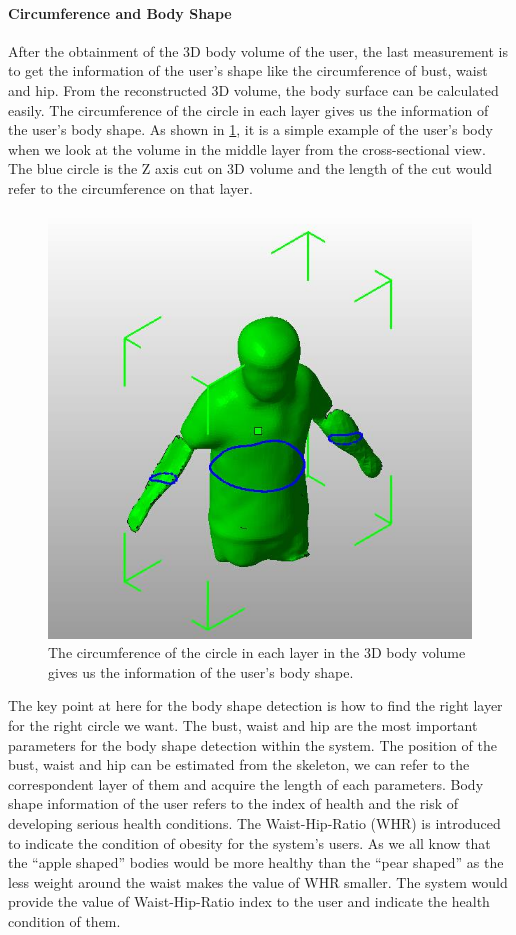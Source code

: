 \paragraph{Circumference and Body Shape}
After the obtainment of the 3D body volume of the user, the last measurement is to get the information of the user's shape like the circumference of bust, waist and hip. %
From the reconstructed 3D volume, the body surface can be calculated easily. The circumference of the circle in each layer gives us the information of the user's body shape. As shown in \figurename{\ref{fig:3-PRMM:Circumference}}, it is a simple example of the user's body when we look at the volume in the middle layer from the cross-sectional view. The blue circle is the Z axis cut on 3D volume and the length of the cut would refer to the circumference on that layer.
\begin{figure}
	\centering
	\includegraphics[width=0.5\linewidth]{figures/3-PRMM/Circumference}
	\caption{The circumference of the circle in each layer in the 3D body volume gives us the information of the user's body shape.}
	\label{fig:3-PRMM:Circumference}
\end{figure}
The key point at here for the body shape detection is how to find the right layer for the right circle we want. The bust, waist and hip are the most important parameters for the body shape detection within the system. 
The position of the bust, waist and hip can be estimated from the skeleton, we can refer to the correspondent layer of them and acquire the length of each parameters.
Body shape information of the user refers to the index of health and the risk of developing serious health conditions. The Waist-Hip-Ratio (WHR)\cite{Consultation2008} is introduced to indicate the condition of obesity for the system's users. As we all know that the ``apple shaped'' bodies would be more healthy than the ``pear shaped'' as the less weight around the waist makes the value of WHR smaller.
The system would provide the value of Waist-Hip-Ratio index to the user and indicate the health condition of them.

